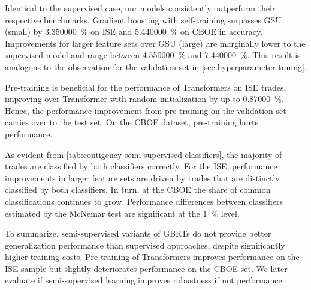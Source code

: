 Identical to the supervised case, our models consistently outperform their respective benchmarks. Gradient boosting with self-training surpasses \gls{GSU} (small) by \SI{3.350000}{\percent} on \gls{ISE} and \SI{5.440000}{\percent} on \gls{CBOE} in accuracy. Improvements for larger feature sets over \gls{GSU} (large) are marginally lower to the supervised model and range between \SI{4.550000}{\percent} and \SI{7.440000}{\percent}. This result is analogous to the observation for the validation set in \cref{sec:hyperparameter-tuning}.

Pre-training is beneficial for the performance of Transformers on \gls{ISE} trades, improving over Transformer with random initialization by up to \SI{0.87000}{\percent}. Hence, the performance improvement from pre-training on the validation set carries over to the test set. On the \gls{CBOE} dataset, pre-training hurts performance.

As evident from \cref{tab:contigency-semi-supervised-classifiers}, the majority of trades are classified by both classifiers correctly. For the \gls{ISE}, performance improvements in larger feature sets are driven by trades that are distinctly classified by both classifiers. In turn, at the \gls{CBOE} the share of common classifications continues to grow. Performance differences between classifiers estimated by the McNemar test are significant at the \SI{1}{\percent} level.

To summarize, semi-supervised variants of \glspl{GBRT} do not provide better generalization performance than supervised approaches, despite significantly higher training costs. Pre-training of Transformers improves performance on the \gls{ISE} sample but slightly deteriorates performance on the \gls{CBOE} set. We later evaluate if semi-supervised learning improves robustness if not performance.

